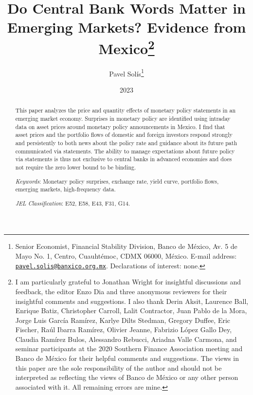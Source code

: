 \documentclass[a4paper, 12pt]{article}
\begin{document}
\title{Do Central Bank Words Matter in Emerging Markets? Evidence from Mexico\thanks{\protect\linespread{1}\protect\selectfont I am particularly grateful to Jonathan Wright for insightful discussions and feedback, the editor Enzo Dia and three anonymous reviewers for their insightful comments and suggestions. I also thank Derin Aksit, Laurence Ball, Enrique Batiz, Christopher Carroll, Lalit Contractor, Juan Pablo de la Mora, Jorge Luis García Ramírez, Karlye Dilts Stedman, Gregory Duffee, Eric Fischer, Raúl Ibarra Ramírez, Olivier Jeanne, Fabrizio López Gallo Dey, Claudia Ramírez Bulos, Alessandro Rebucci, Ariadna Valle Carmona, and seminar participants at the 2020 Southern Finance Association meeting and Banco de México for their helpful comments and suggestions. The views in this paper are the sole responsibility of the author and should not be interpreted as reflecting the views of Banco de México or any other person associated with it. All remaining errors are mine.}
}
\author{Pavel Solís\thanks{\protect\linespread{1}\protect\selectfont Senior Economist, Financial Stability Division, Banco de México, Av. 5 de Mayo No. 1, Centro, Cuauhtémoc, CDMX 06000, México. E-mail address: \href{mailto:pavel.solis@banxico.org.mx}{\texttt{pavel.solis@banxico.org.mx}}. Declarations of interest: none.}
}
\date{2023}

\maketitle	\vspace{-4ex}

\begin{abstract}
	This paper analyzes the price and quantity effects of monetary policy statements in an emerging market economy. Surprises in monetary policy are identified using intraday data on asset prices around monetary policy announcements in Mexico. I find that asset prices and the portfolio flows of domestic and foreign investors respond strongly and persistently to both news about the policy rate and guidance about its future path communicated via statements. The ability to manage expectations about future policy via statements is thus not exclusive to central banks in advanced economies and does not require the zero lower bound to be binding. 
	
	\vspace{.5cm}
	\noindent \textit{Keywords}: Monetary policy surprises, exchange rate, yield curve, portfolio flows, emerging markets, high-frequency data.
	
	\noindent \textit{JEL Classification}: E52, E58, E43, F31, G14. 
	\vfill
	
	\pagebreak
\end{abstract}
\end{document}
